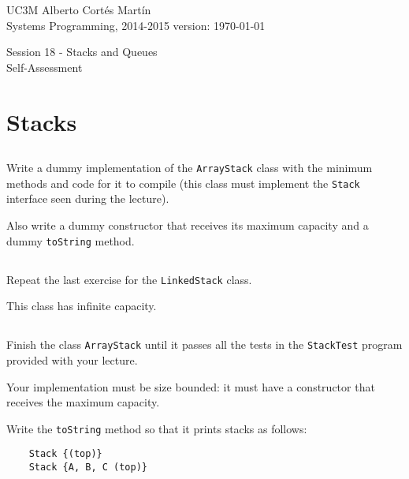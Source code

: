 \documentclass[a4paper, 11pt]{article}
\newcommand{\realtitle}{Session 18 - Stacks and Queues}
\begin{document}
\makebox[\linewidth]{\rule{\textwidth}{0.4pt}}
UC3M \hfill Alberto Cortés Martín\\
Systems Programming, 2014-2015 \hfill version: \today\\
\makebox[\linewidth]{\rule{\textwidth}{0.4pt}}
\begin{center}
  \Large{\realtitle}\\Self-Assessment
\end{center}
\makebox[\linewidth]{\rule{\textwidth}{0.4pt}}
\vspace{1cm}


\section{Stacks}

\subsection{}

Write a dummy implementation of the \texttt{ArrayStack} class with the minimum
methods and code for it to compile (this class must implement the
\texttt{Stack} interface seen during the lecture).

Also write a dummy constructor that receives its maximum capacity and a dummy
\verb+toString+ method.

\subsection{}

Repeat the last exercise for the \texttt{LinkedStack} class.

This class has infinite capacity.

\subsection{}

Finish the class \texttt{ArrayStack} until it passes all the tests in the
\verb+StackTest+ program provided with your lecture.

Your implementation must be size bounded: it must have a constructor that
receives the maximum capacity.

Write the \verb+toString+ method so that it prints stacks as follows:

\begin{verbatim}
    Stack {(top)}
    Stack {A, B, C (top)}
\end{verbatim}
\end{document}
